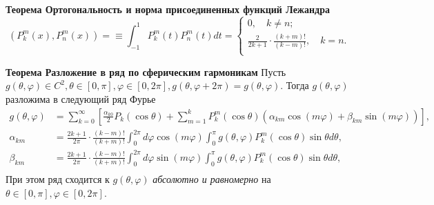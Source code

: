 \documentclass{article}
\begin{document}
\noindent\textbf{Теорема Ортогональность и норма присоединенных функций Лежандра}
\begin{equation}
(P_k^m(x),P_n^m(x))=\equiv \int_{-1}^{1}P_k^m(t)P_n^m(t)dt=\left\{\begin{array}{l}
0,\quad k\ne n;\\
\frac{2}{2k+1}\cdot\frac{(k+m)!}{(k-m)!},\quad k=n.\\
\end{array}\right.
\end{equation} 

\noindent\textbf{Теорема Разложение в ряд по сферическим гармоникам} Пусть $g(\theta,\varphi)\in C^2,\theta\in[0,\pi],\varphi\in[0,2\pi],g(\theta,\varphi+2\pi)=g(\theta,\varphi)$. Тогда $g(\theta,\varphi)$ разложима в следующий ряд Фурье
\begin{equation}
\begin{aligned}
g(\theta,\varphi)&=\sum_{k=0}^{\infty} \left[ \frac{\alpha_{k0}}{2} P_k(\cos\theta)+\sum_{m=1}^{k} P_k^m(\cos\theta)(\alpha_{km}\cos(m\varphi)+\beta_{km}\sin(m\varphi))\right],\\
\alpha_{km}&=\frac{2k+1}{2\pi}\cdot\frac{(k-m)!}{(k+m)!}\int_{0}^{2\pi} d\varphi \cos(m\varphi)\int_{0}^{\pi} g(\theta,\varphi)P_k^m(\cos\theta)\sin\theta d\theta,\\
\beta_{km}&=\frac{2k+1}{2\pi}\cdot\frac{(k-m)!}{(k+m)!}\int_{0}^{2\pi} d\varphi \sin(m\varphi)\int_{0}^{\pi} g(\theta,\varphi)P_k^m(\cos\theta)\sin\theta d\theta,\\
\end{aligned}
\label{6}
\end{equation}
При этом ряд  сходится к $g(\theta,\varphi)$ \emph{абсолютно и равномерно} на $\theta\in[0,\pi],\varphi\in[0,2\pi]$. 
\end{document}
